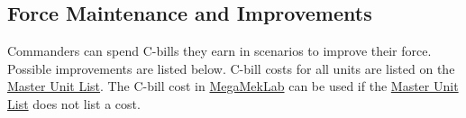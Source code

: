 \documentclass{article}
\begin{document}
\newpage

\subsection{Force Maintenance and Improvements}
\label{subsec:force_maintenance}

Commanders can spend C-bills they earn in scenarios to improve their force.
Possible improvements are listed below.
C-bill costs for all units are listed on the \href{http://www.masterunitlist.info}{Master Unit List}.
The C-bill cost in \href{https://megamek.org}{MegaMekLab} can be used if the \href{http://www.masterunitlist.info}{Master Unit List} does not list a cost.
\end{document}
